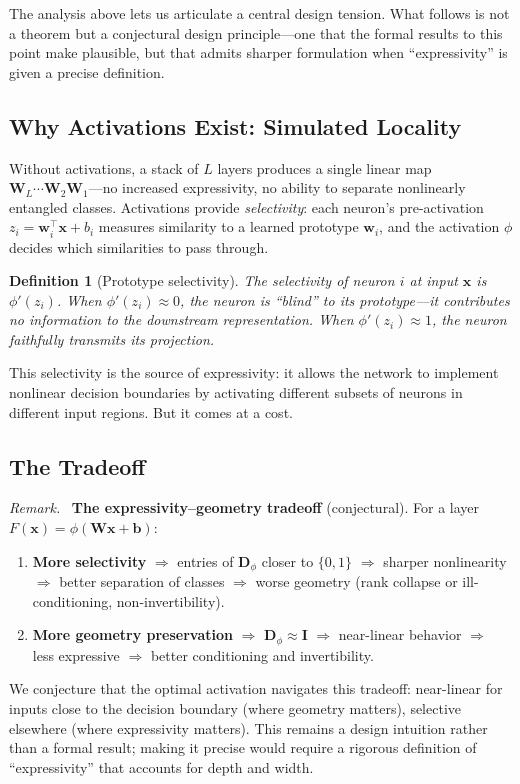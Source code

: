 \documentclass[11pt,a4paper]{article}
\newtheorem{definition}[theorem]{Definition}
\theoremstyle{remark}
\newenvironment{designprinciple}{\par\medskip\noindent\textit{Remark.}\ }{\par\medskip}
\begin{document}
The analysis above lets us articulate a central design tension.
What follows is not a theorem but a conjectural design principle---one that the formal results to this point make plausible, but that admits sharper formulation when ``expressivity'' is given a precise definition.

\subsection{Why Activations Exist: Simulated Locality}

Without activations, a stack of $L$ layers produces a single linear map $\mathbf{W}_L \cdots \mathbf{W}_2 \mathbf{W}_1$---no increased expressivity, no ability to separate nonlinearly entangled classes.
Activations provide \emph{selectivity}: each neuron's pre-activation $z_i = \mathbf{w}_i^\top \mathbf{x} + b_i$ measures similarity to a learned prototype $\mathbf{w}_i$, and the activation $\phi$ decides which similarities to pass through.

\begin{definition}[Prototype selectivity]
The \emph{selectivity} of neuron $i$ at input $\mathbf{x}$ is $\phi'(z_i)$.
When $\phi'(z_i) \approx 0$, the neuron is ``blind'' to its prototype---it contributes no information to the downstream representation.
When $\phi'(z_i) \approx 1$, the neuron faithfully transmits its projection.
\end{definition}

This selectivity is the source of expressivity: it allows the network to implement nonlinear decision boundaries by activating different subsets of neurons in different input regions.
But it comes at a cost.

\subsection{The Tradeoff}

\begin{designprinciple}
\textbf{The expressivity--geometry tradeoff} (conjectural).
For a layer $F(\mathbf{x}) = \phi(\mathbf{W}\mathbf{x} + \mathbf{b})$:
\begin{enumerate}[label=(\roman*)]
  \item \textbf{More selectivity} $\Rightarrow$ entries of $\mathbf{D}_\phi$ closer to $\{0, 1\}$ $\Rightarrow$ sharper nonlinearity $\Rightarrow$ better separation of classes $\Rightarrow$ worse geometry (rank collapse or ill-conditioning, non-invertibility).
  \item \textbf{More geometry preservation} $\Rightarrow$ $\mathbf{D}_\phi \approx \mathbf{I}$ $\Rightarrow$ near-linear behavior $\Rightarrow$ less expressive $\Rightarrow$ better conditioning and invertibility.
\end{enumerate}
We conjecture that the optimal activation navigates this tradeoff: near-linear for inputs close to the decision boundary (where geometry matters), selective elsewhere (where expressivity matters).
This remains a design intuition rather than a formal result; making it precise would require a rigorous definition of ``expressivity'' that accounts for depth and width.
\end{designprinciple}
\end{document}

